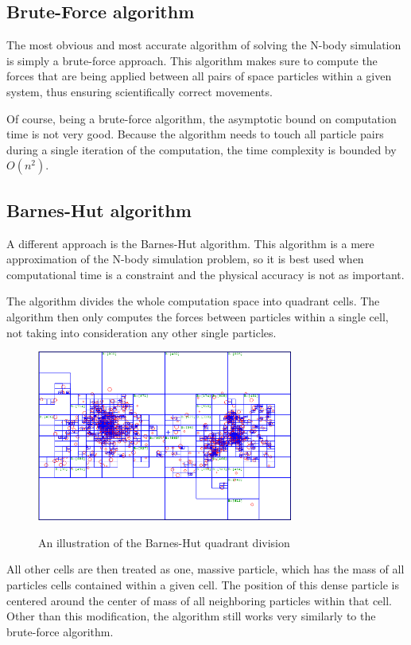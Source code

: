 \documentclass[12pt]{article}
\begin{document}
\subsection*{Brute-Force algorithm}
The most obvious and most accurate algorithm of solving the N-body simulation is simply a brute-force approach. This algorithm makes sure to compute the forces that are being applied between all pairs of space particles within a given system, thus ensuring scientifically correct movements.

Of course, being a brute-force algorithm, the asymptotic bound on computation time is not very good. Because the algorithm needs to touch all particle pairs during a single iteration of the computation, the time complexity is bounded by $O(n^2)$.

\subsection*{Barnes-Hut algorithm}
A different approach is the Barnes-Hut algorithm. This algorithm is a mere approximation of the N-body simulation problem, so it is best used when computational time is a constraint and the physical accuracy is not as important.

The algorithm divides the whole computation space into quadrant cells. The algorithm then only computes the forces between particles within a single cell, not taking into consideration any other single particles. 

\begin{figure}[ht]
	\centering
	\includegraphics[width=0.75\textwidth]{barneshut.png}
	\caption{An illustration of the Barnes-Hut quadrant division}
	\cite{barnespic}
\end{figure} 

All other cells are then treated as one, massive particle, which has the mass of all particles cells contained within a given cell. The position of this dense particle is centered around the center of mass of all neighboring particles within that cell. Other than this modification, the algorithm still works very similarly to the brute-force algorithm. 
\end{document}
